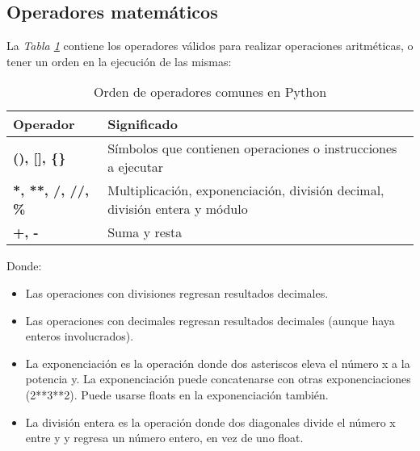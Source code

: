 \subsection{Operadores matemáticos}
\hspace{0.55cm}La \textit{Tabla \ref{tab: 2}} contiene los operadores válidos para realizar operaciones aritméticas, o tener un orden en la ejecución de las mismas:
\begin{table}[H]
    \begin{center}
        \caption{Orden de operadores comunes en Python}
        \label{tab: 2}
        \begin{tabular}{m{3cm} m{10cm}}
            \hline
            \textbf{Operador} & \textbf{Significado} \\
            \hline
            \textbf{(), [], \{\}}		& Símbolos que contienen operaciones o instrucciones a ejecutar \\
            \textbf{*, **, /, //, \%}	& Multiplicación, exponenciación, división decimal, división entera y módulo \\
            \textbf{+, -}				& Suma y resta \\
            \hline
        \end{tabular}
    \end{center}
\end{table}

Donde:
\begin{itemize}
	\item Las operaciones con divisiones regresan resultados decimales.
	\item Las operaciones con decimales regresan resultados decimales (aunque haya enteros involucrados).
	\item La exponenciación es la operación donde dos asteriscos eleva el número x a la potencia y. La exponenciación puede concatenarse con otras exponenciaciones (2**3**2). Puede usarse floats en la exponenciación también.
	\item La división entera es la operación donde dos diagonales divide el número x entre y y regresa un número entero, en vez de uno float.
\end{itemize}


